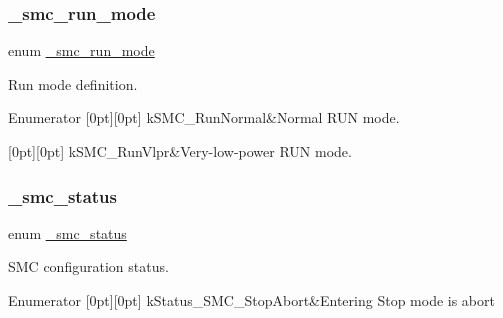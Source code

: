 \subsubsection{\texorpdfstring{\_smc\_run\_mode}{\_smc\_run\_mode}}
{\footnotesize\ttfamily enum \mbox{\hyperlink{group__smc_gac2c182287ebbb6119d8bcbb6ead71e53}{\+\_\+smc\+\_\+run\+\_\+mode}}}



Run mode definition. 

\begin{DoxyEnumFields}{Enumerator}
[0pt][0pt]{}\mbox{\label{group__smc_ggac2c182287ebbb6119d8bcbb6ead71e53abaeb1d66b5ab95289522985e831186de}} 
k\+S\+M\+C\+\_\+\+Run\+Normal&Normal R\+UN mode. \\
\hline

[0pt][0pt]{}\mbox{\label{group__smc_ggac2c182287ebbb6119d8bcbb6ead71e53ac1461903d002daab1af773d6d506fea3}} 
k\+S\+M\+C\+\_\+\+Run\+Vlpr&Very-\/low-\/power R\+UN mode. \\
\hline

\end{DoxyEnumFields}
\mbox{\label{group__smc_gabecec62029f0326a4d132d680946ac14}} 
\subsubsection{\texorpdfstring{\_smc\_status}{\_smc\_status}}
{\footnotesize\ttfamily enum \mbox{\hyperlink{group__smc_gabecec62029f0326a4d132d680946ac14}{\+\_\+smc\+\_\+status}}}



S\+MC configuration status. 

\begin{DoxyEnumFields}{Enumerator}
[0pt][0pt]{}\mbox{\label{group__smc_ggabecec62029f0326a4d132d680946ac14ac8b70e0e27736678bcb91340b06c011e}} 
k\+Status\+\_\+\+S\+M\+C\+\_\+\+Stop\+Abort&Entering Stop mode is abort \\
\hline

\end{DoxyEnumFields}
\mbox{\label{group__smc_ga107d1c64902b4a1a0270a51008b854d5}} 
